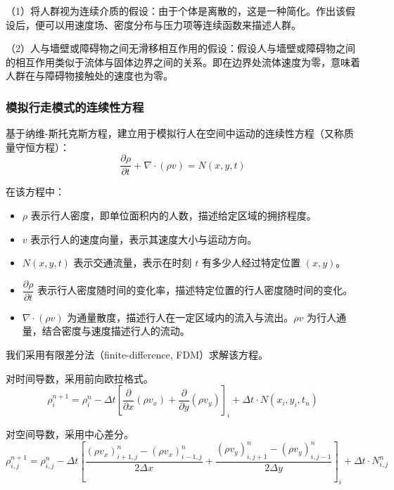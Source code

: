 \documentclass[11pt,a4paper]{ctexart}
\begin{document}
（1）将人群视为连续介质的假设：由于个体是离散的，这是一种简化。作出该假设后，便可以用速度场、密度分布与压力项等连续函数来描述人群。

（2）人与墙壁或障碍物之间无滑移相互作用的假设：假设人与墙壁或障碍物之间的相互作用类似于流体与固体边界之间的关系。即在边界处流体速度为零，意味着人群在与障碍物接触处的速度也为零。

\subsubsection{模拟行走模式的连续性方程}

基于纳维-斯托克斯方程，建立用于模拟行人在空间中运动的连续性方程（又称质量守恒方程）\cite{ref5}：
\begin{equation}
\frac{\partial\rho}{\partial t}+\nabla\cdot(\rho v)=N(x,y,t)\tag{5}
\end{equation}

在该方程中：

\begin{itemize}[leftmargin=2em,itemsep=2pt,topsep=2pt]
\item $\rho$ 表示行人密度，即单位面积内的人数，描述给定区域的拥挤程度。
\item $v$ 表示行人的速度向量，表示其速度大小与运动方向。
\item $N(x,y,t)$ 表示交通流量，表示在时刻 $t$ 有多少人经过特定位置 $(x,y)$。
\item $\dfrac{\partial\rho}{\partial t}$ 表示行人密度随时间的变化率，描述特定位置的行人密度随时间的变化。
\item $\nabla\cdot(\rho v)$ 为通量散度，描述行人在一定区域内的流入与流出。$\rho v$ 为行人通量，结合密度与速度描述行人的流动。
\end{itemize}

我们采用有限差分法（finite-difference, FDM）求解该方程。

对时间导数，采用前向欧拉格式。
\begin{equation}
\rho_i^{n+1}=\rho_i^{n}-\Delta t\left[\frac{\partial}{\partial x}(\rho v_x)+\frac{\partial}{\partial y}(\rho v_y)\right]_i+\Delta t\cdot N(x_i,y_i,t_n)\tag{6}
\end{equation}

对空间导数，采用中心差分。
\begin{equation}
\rho_{i,j}^{n+1}=\rho_{i,j}^{n}-\Delta t\left[\frac{(\rho v_x)_{i+1,j}^{n}-(\rho v_x)_{i-1,j}^{n}}{2\Delta x}+\frac{(\rho v_y)_{i,j+1}^{n}-(\rho v_y)_{i,j-1}^{n}}{2\Delta y}\right]_i+\Delta t\cdot N_{i,j}^{n}\tag{7}
\end{equation}
\end{document}
